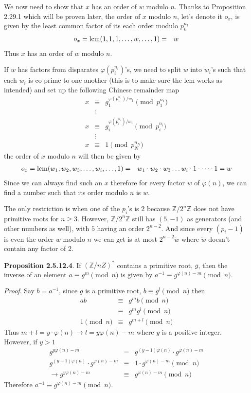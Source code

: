 \documentclass[aps,preprint,preprintnumbers,nofootinbib,showpacs,prd]{revtex4-1}
\newcommand{\nbea}{\begin{eqnarray*}}
\newcommand{\neea}{\end{eqnarray*}}
\begin{document}
We now need to show that $x$ has an order of $w$ modulo $n$. Thanks to Proposition 2.29.1 which will be proven later, the order of $x$ modulo $n$, let's denote it $o_x$, is given by the least common factor of its each order modulo $p_k^{n_k}$
%
\nbea
o_x = {\rm lcm}(1, 1, 1, \dots, w, \dots, 1) & = & w
\neea
%
Thus $x$ has an order of $w$ modulo $n$. 

If $w$ has factors from disparates $\varphi(p_i^{n_i})$'s, we need to split $w$ into $w_i$'s such that each $w_i$ is co-prime to one another (this is to make sure the lcm works as intended) and set up the following Chinese remainder map
%
\nbea
x & \equiv & g_1^{\varphi(p_1^{n_1})/w_1} \pmod{p_1^{n_1}} \\
& \vdots & \\
x & \equiv & g_i^{\varphi(p_i^{n_i})/w_i} \pmod{p_i^{n_i}} \\
& \vdots & \\
x & \equiv & 1 \pmod{p_N^{n_N}}
\neea
%
the order of $x$ modulo $n$ will then be given by
%
\nbea
o_x = {\rm lcm}(w_1, w_2, w_3, \dots, w_i, \dots, 1) & = & w_1 \cdot w_2 \cdot w_3 \dots w_i \cdot 1 \cdot \dots \cdot 1 = w 
\neea
%
Since we can always find such an $x$ therefore for every factor $w$ of $\varphi(n)$, we can find a number such that its order modulo $n$ is $w$.

The only restriction is when one of the $p_i$'s is $2$ because $\mathbb{Z}/2^n\mathbb{Z}$ does not have primitive roots for $n \ge 3$. However, $\mathbb{Z}/2^n\mathbb{Z}$ still has $(5, -1)$ as generators (and other numbers as well), with $5$ having an order $2^{n-2}$. And since every $(p_i-1)$ is even the order $w$ modulo $n$ we can get is at most $2^{n-2} \tilde w$ where $\tilde w$ doesn't contain any factor of 2.

{\bf Proposition 2.5.12.4}. If $(\mathbb{Z}/n{Z})^*$ contains a primitive root, $g$, then the inverse of an element $a \equiv g^m \pmod{n}$ is given by $a^{-1} \equiv g^{\varphi(n) - m} \pmod{n}$.

{\it Proof}. Say $b = a^{-1}$, since $g$ is a primitive root, $b \equiv g^l \pmod{n}$ then
%
\nbea
ab & \equiv & g^m b \pmod{n}\\
& \equiv & g^m g^l \pmod{n} \\
1 \pmod{n} & \equiv & g^{m+l} \pmod{n}
\neea
%
Thus $m+l = y \cdot \varphi(n) \to l = y\varphi(n) - m$ where $y$ is a positive integer. However, if $ y > 1$
%
\nbea
g^{y\varphi(n) - m} & = & g^{(y-1)\varphi(n)} \cdot g^{\varphi(n) - m} \\
g^{(y-1)\varphi(n)} \cdot g^{\varphi(n) - m} & \equiv & 1 \cdot g^{\varphi(n) - m} \pmod{n} \\
\to g^{y\varphi(n) - m} & \equiv & g^{\varphi(n) - m} \pmod{n}
\neea
%
Therefore $a^{-1} \equiv g^{\varphi(n) - m} \pmod{n}$.
\end{document}
